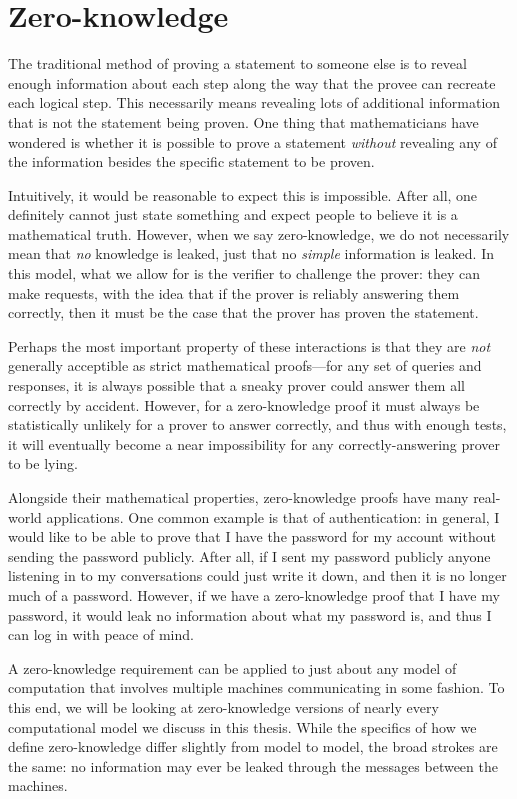 \documentclass[english,12pt]{reedthesis}
\theoremstyle{plain}
\theoremstyle{definition}
\theoremstyle{remark}
\begin{document}
\section{Zero-knowledge}

The traditional method of proving a statement to someone else is to reveal
enough information about each step along the way that the provee can recreate
each logical step. This necessarily means revealing lots of additional
information that is not the statement being proven. One thing that
mathematicians have wondered is whether it is possible to prove a statement
\emph{without} revealing any of the information besides the specific statement
to be proven.

Intuitively, it would be reasonable to expect this is impossible. After all, one
definitely cannot just state something and expect people to believe it is a
mathematical truth. However, when we say zero-knowledge, we do not necessarily
mean that \emph{no} knowledge is leaked, just that no \emph{simple} information
is leaked. In this model, what we allow for is the verifier to challenge the
prover: they can make requests, with the idea that if the prover is reliably
answering them correctly, then it must be the case that the prover has proven
the statement.

Perhaps the most important property of these interactions is that they are
\emph{not} generally acceptible as strict mathematical proofs---for any set of
queries and responses, it is always possible that a sneaky prover could answer
them all correctly by accident. However, for a zero-knowledge proof it must
always be statistically unlikely for a prover to answer correctly, and thus with
enough tests, it will eventually become a near impossibility for any
correctly-answering prover to be lying.

Alongside their mathematical properties, zero-knowledge proofs have many
real-world applications. One common example is that of authentication: in
general, I would like to be able to prove that I have the password for my
account without sending the password publicly. After all, if I sent my password
publicly anyone listening in to my conversations could just write it down, and
then it is no longer much of a password. However, if we have a zero-knowledge
proof that I have my password, it would leak no information about what my
password is, and thus I can log in with peace of mind.

A zero-knowledge requirement can be applied to just about any model of
computation that involves multiple machines communicating in some fashion. To
this end, we will be looking at zero-knowledge versions of nearly every
computational model we discuss in this thesis. While the specifics of how we
define zero-knowledge differ slightly from model to model, the broad strokes are
the same: no information may ever be leaked through the messages between the
machines.
\end{document}
